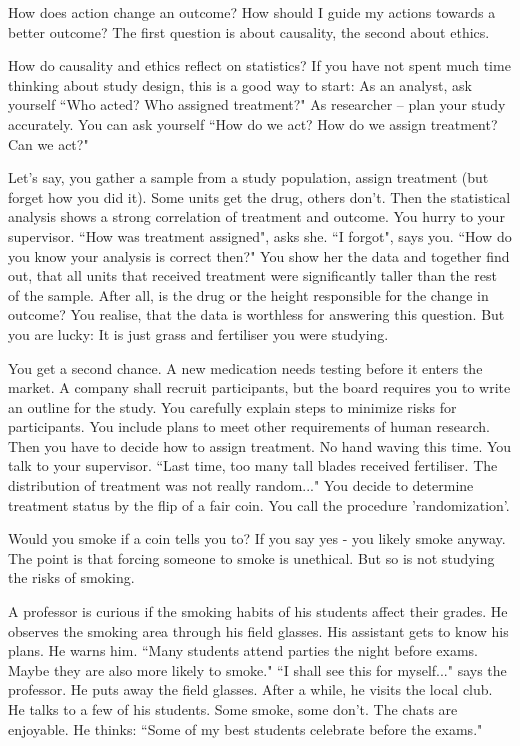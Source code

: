 How does action change an outcome?
How should I guide my actions towards a better outcome?
The first question is about causality, the second about ethics.

How do causality and ethics reflect on statistics?
If you have not spent much time thinking about study design, this is a good way to start: 
As an analyst, ask yourself “Who acted? Who assigned treatment?"
As researcher -- plan your study accurately. You can ask yourself “How do we act? How do we assign treatment? Can we act?"

Let's say, you gather a sample from a study population, assign treatment (but forget how you did it). Some units get the drug, others don't. Then the statistical analysis shows a strong correlation of treatment and outcome. You hurry to your supervisor. “How was treatment assigned", asks she. “I forgot", says you.
“How do you know your analysis is correct then?"
You show her the data and together find out, that all units that received treatment were significantly taller than the rest of the sample.
After all, is the drug or the height responsible for the change  in outcome?
You realise, that the data is worthless for answering this question.
But you are lucky: It is just grass and fertiliser you were studying.

You get a second chance. A new medication needs testing before it enters the market. 
A company shall recruit participants, but the board requires you to write an outline for the study.
You carefully  explain steps to minimize risks for participants. You include plans to meet other requirements of human research.
Then you have to decide how to assign treatment.
No hand waving this time. You talk to your supervisor.
“Last time, too many tall blades received fertiliser. The distribution of treatment was not really random..."
You decide to determine treatment status by the flip of a fair coin.
You call the procedure 'randomization'.

Would you smoke if a coin tells you to? If you say yes - you likely smoke anyway. The point is that forcing someone to smoke is unethical. But so is not studying the risks of smoking.

A professor is curious if the smoking habits of his students affect their grades. 
He observes the smoking area through his field glasses.
His assistant gets to know his plans. He warns him. “Many students attend parties the night before exams. Maybe they are also more likely to smoke." “I shall see this for myself..." says the professor. He puts away the field glasses. After a while, he visits the local club.
He talks to a few of his students. Some smoke, some don't. The chats are enjoyable. He thinks: “Some of my best students celebrate before the exams."

